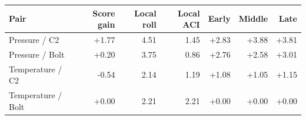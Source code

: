 \begin{tabular}{lrrrrrr}
\toprule
Pair & Score gain & Local roll & Local ACI & Early & Middle & Late \\
\midrule
Pressure / C2 & +1.77 & 4.51 & 1.45 & +2.83 & +3.88 & +3.81 \\
Pressure / Bolt & +0.20 & 3.75 & 0.86 & +2.76 & +2.58 & +3.01 \\
Temperature / C2 & -0.54 & 2.14 & 1.19 & +1.08 & +1.05 & +1.15 \\
Temperature / Bolt & +0.00 & 2.21 & 2.21 & +0.00 & +0.00 & +0.00 \\
\bottomrule
\end{tabular}
